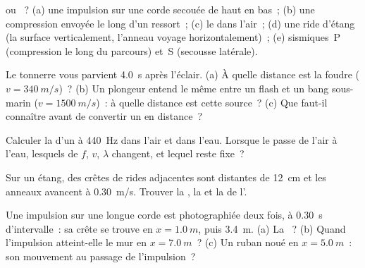 \begin{exercise}[$\star$]\label{exo:g12:mechanical-waves:2}
 ou ~? (a) une impulsion sur une corde
secouée de haut en bas~; (b) une compression envoyée le long d'un
ressort~; (c) le  dans l'air~; (d) une ride d'étang (la surface
 verticalement, l'anneau voyage horizontalement)~; (e)
 sismiques~P (compression le long du parcours) et~S (secousse
latérale).
\end{exercise}

\begin{exercise}[$\star$]\label{exo:g12:mechanical-waves:3}
Le tonnerre vous parvient \qty{4.0}{s} après l'éclair. (a) À quelle
distance est la foudre ($v = \qty{340}{m/s}$)~? (b) Un plongeur entend
le même  entre un flash et un bang sous-marin
($v = \qty{1500}{m/s}$)~: à quelle distance est cette source~?
(c) Que faut-il connaître avant de convertir un  en distance~?
\end{exercise}

\begin{exercise}[$\star$]\label{exo:g12:mechanical-waves:4}
Calculer la  d'un  à \qty{440}{Hz} dans
l'air et dans l'eau. Lorsque le  passe de l'air à l'eau, lesquels
de $f$, $v$, $\lambda$ changent, et lequel reste fixe~?
\end{exercise}

\begin{exercise}[$\star$]\label{exo:g12:mechanical-waves:5}
Sur un étang, des crêtes de rides adjacentes sont distantes de
\qty{12}{cm} et les anneaux avancent à \qty{0.30}{m/s}. Trouver la
, la  et la
 de l'.
\end{exercise}

\begin{exercise}[$\star\star$]\label{exo:g12:mechanical-waves:6}
Une impulsion sur une longue corde est photographiée deux fois, à
\qty{0.30}{s} d'intervalle~: sa crête se trouve en $x = \qty{1.0}{m}$,
puis \qty{3.4}{m}. (a) La ~? (b) Quand l'impulsion atteint-elle
le mur en $x = \qty{7.0}{m}$~? (c) Un ruban noué en $x = \qty{5.0}{m}$~:
son mouvement au passage de l'impulsion~?
\end{exercise}

